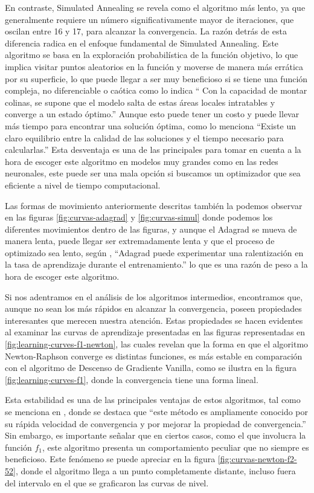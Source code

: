 \documentclass{article}
\begin{document}
En contraste, Simulated Annealing se revela como el algoritmo más lento, ya que generalmente requiere un número significativamente mayor de iteraciones, que oscilan entre 16 y 17, para alcanzar la convergencia. La razón detrás de esta diferencia radica en el enfoque fundamental de Simulated Annealing. Este algoritmo se basa en la exploración probabilística de la función objetivo, lo que implica visitar puntos aleatorios en la función y moverse de manera más errática por su superficie, lo que puede llegar a ser muy beneficioso si se tiene una función compleja, no diferenciable o caótica como lo indica `` Con la capacidad de montar colinas, se supone que el modelo salta de estas áreas locales intratables y converge a un estado óptimo.'' Aunque esto puede tener un costo y puede llevar más tiempo para encontrar una solución óptima, como lo menciona  ``Existe un claro equilibrio entre la calidad de las soluciones y el tiempo necesario para calcularlas.'' Esta desventaja es una de las principales para tomar en cuenta a la hora de escoger este algoritmo en modelos muy grandes como en las redes neuronales, este puede ser una mala opción si buscamos un optimizador que sea eficiente a nivel de tiempo computacional. 

Las formas de movimiento anteriormente descritas también la podemos observar en las figuras \ref{fig:curvas-adagrad} y \ref{fig:curvas-simul} donde podemos los diferentes movimientos dentro de las figuras, y aunque el Adagrad se mueva de manera lenta, puede llegar ser extremadamente lenta y que el proceso de optimizado sea lento, según \cite{ruder2016overview}, ``Adagrad puede experimentar una ralentización en la tasa de aprendizaje durante el entrenamiento.'' lo que es una razón de peso a la hora de escoger este algoritmo. 

Si nos adentramos en el análisis de los algoritmos intermedios, encontramos que, aunque no sean los más rápidos en alcanzar la convergencia, poseen propiedades interesantes que merecen nuestra atención. Estas propiedades se hacen evidentes al examinar las curvas de aprendizaje presentadas en las figuras representadas en \ref{fig:learning-curves-f1-newton}, las cuales revelan que la forma en que el algoritmo Newton-Raphson converge es distintas funciones, es más estable en comparación con el algoritmo de Descenso de Gradiente Vanilla, como se ilustra en la figura \ref{fig:learning-curves-f1}, donde la convergencia tiene una forma lineal.

Esta estabilidad es una de las principales ventajas de estos algoritmos, tal como se menciona en , donde se destaca que ``este método es ampliamente conocido por su rápida velocidad de convergencia y por mejorar la propiedad de convergencia.'' Sin embargo, es importante señalar que en ciertos casos, como el que involucra la función $f_1$, este algoritmo presenta un comportamiento peculiar que no siempre es beneficioso. Este fenómeno se puede apreciar en la figura \ref{fig:curvas-newton-f2-52}, donde el algoritmo llega a un punto completamente distante, incluso fuera del intervalo en el que se graficaron las curvas de nivel.
\end{document}
